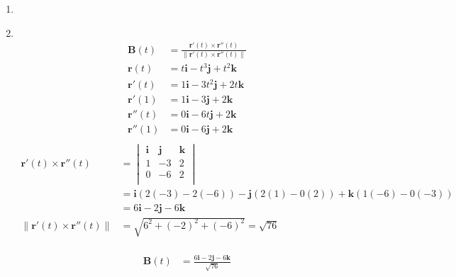 \documentclass[11pt]{article}
\newcommand\Item[1][]{%
  \ifx\relax#1\relax  \item \else \item[#1] \fi
  \abovedisplayskip=0pt\abovedisplayshortskip=0pt~\vspace*{-\baselineskip}}
\begin{document}
\begin{enumerate}
\begin{enumerate}
              \Item
              \begin{align*}
                  \textbf{B}(t)   & = \frac{\textbf{r}'(t)\times\textbf{r}''(t)}{\| \textbf{r}'(t)\times\textbf{r}''(t) \|} \\
                  \textbf{r}(t)   & = t\textbf{i} - t^3\textbf{j} + t^2\textbf{k}                                           \\
                  \textbf{r}'(t)  & = 1\textbf{i} - 3t^2\textbf{j} + 2t\textbf{k}                                           \\
                  \textbf{r}'(1)  & =  1\textbf{i} - 3\textbf{j} + 2\textbf{k}                                              \\
                  \textbf{r}''(t) & = 0\textbf{i} - 6t\textbf{j} + 2\textbf{k}                                              \\
                  \textbf{r}''(1) & = 0\textbf{i} - 6\textbf{j} + 2\textbf{k}                                               \\
              \end{align*}
              \begin{align*}
                  \textbf{r}'(t)\times\textbf{r}''(t)       & =
                  \begin{vmatrix}
                      \textbf{i} & \textbf{j} & \textbf{k} \\
                      1          & -3         & 2          \\
                      0          & -6         & 2          \\
                  \end{vmatrix}                                                                                              \\
                                                            & = \textbf{i}(2(-3)-2(-6)) - \textbf{j}(2(1)-0(2)) + \textbf{k}(1(-6)-0(-3)) \\
                                                            & = 6\textbf{i} - 2\textbf{j} - 6\textbf{k}                                   \\
                  \| \textbf{r}'(t)\times\textbf{r}''(t) \| & = \sqrt{6^2 + (-2)^2 + (-6)^2} = \sqrt{76}                                  \\
              \end{align*}

              \begin{align*}
                  \textbf{B}(t) & = \frac{6\textbf{i} - 2\textbf{j} - 6\textbf{k}}{\sqrt{76}} \\
              \end{align*}


\end{enumerate}
\end{enumerate}
\end{document}
